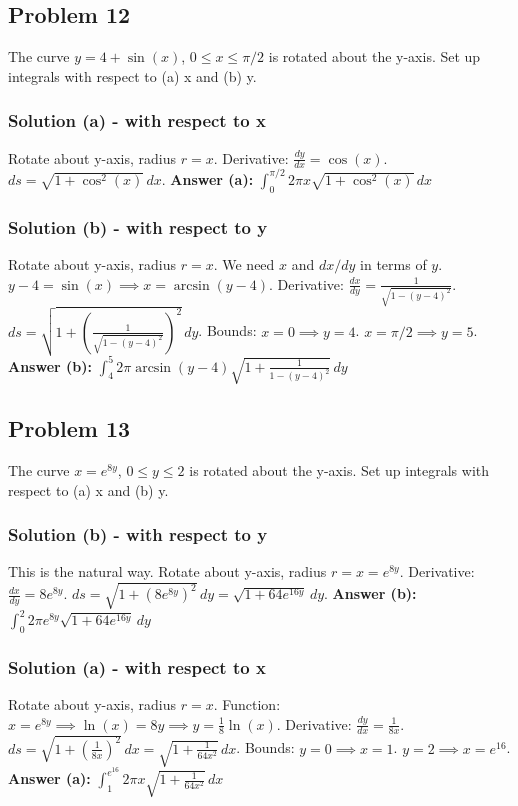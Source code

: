 \documentclass{article}
\begin{document}
\subsection{Problem 12}
The curve $y = 4+\sin(x)$, $0 \le x \le \pi/2$ is rotated about the y-axis. Set up integrals with respect to (a) x and (b) y.
\subsubsection*{Solution (a) - with respect to x}
Rotate about y-axis, radius $r=x$.
Derivative: $ \frac{dy}{dx} = \cos(x) $.
$ds = \sqrt{1+\cos^2(x)} \,dx $.
\textbf{Answer (a):} $ \int_0^{\pi/2} 2\pi x \sqrt{1+\cos^2(x)} \,dx $

\subsubsection*{Solution (b) - with respect to y}
Rotate about y-axis, radius $r=x$.
We need $x$ and $dx/dy$ in terms of $y$.
$y-4 = \sin(x) \implies x = \arcsin(y-4) $.
Derivative: $ \frac{dx}{dy} = \frac{1}{\sqrt{1-(y-4)^2}} $.
$ds = \sqrt{1 + \left(\frac{1}{\sqrt{1-(y-4)^2}}\right)^2} \,dy $.
Bounds: $x=0 \implies y=4$. $x=\pi/2 \implies y=5$.
\textbf{Answer (b):} $ \int_4^5 2\pi \arcsin(y-4) \sqrt{1 + \frac{1}{1-(y-4)^2}} \,dy $

\subsection{Problem 13}
The curve $x = e^{8y}$, $0 \le y \le 2$ is rotated about the y-axis. Set up integrals with respect to (a) x and (b) y.
\subsubsection*{Solution (b) - with respect to y}
This is the natural way. Rotate about y-axis, radius $r=x=e^{8y}$.
Derivative: $ \frac{dx}{dy} = 8e^{8y} $.
$ds = \sqrt{1+(8e^{8y})^2} \,dy = \sqrt{1+64e^{16y}} \,dy $.
\textbf{Answer (b):} $ \int_0^2 2\pi e^{8y} \sqrt{1+64e^{16y}} \,dy $

\subsubsection*{Solution (a) - with respect to x}
Rotate about y-axis, radius $r=x$.
Function: $x=e^{8y} \implies \ln(x)=8y \implies y = \frac{1}{8}\ln(x) $.
Derivative: $ \frac{dy}{dx} = \frac{1}{8x} $.
$ds = \sqrt{1+(\frac{1}{8x})^2} \,dx = \sqrt{1+\frac{1}{64x^2}} \,dx $.
Bounds: $y=0 \implies x=1$. $y=2 \implies x=e^{16}$.
\textbf{Answer (a):} $ \int_1^{e^{16}} 2\pi x \sqrt{1+\frac{1}{64x^2}} \,dx $
\end{document}
